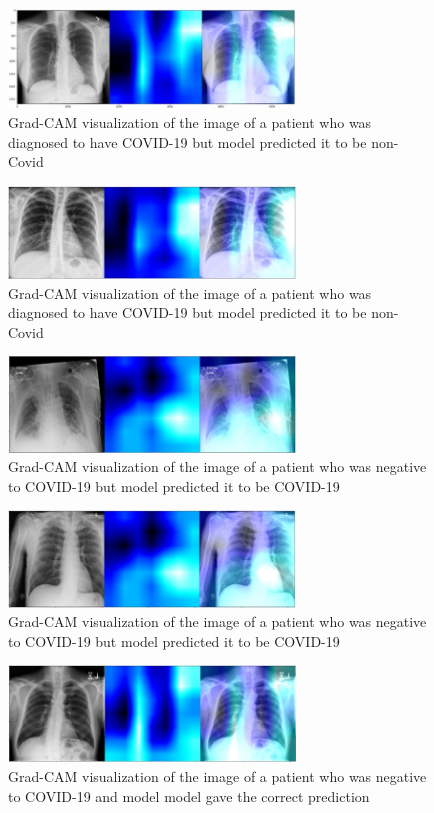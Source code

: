 \documentclass[10pt,journal,compsoc]{IEEEtran}
\begin{document}
\begin{figure}
\centering
\includegraphics[width=3.0in]{Picture4.jpg}
\caption{Grad-CAM visualization of the image of a patient who was diagnosed to have COVID-19 but model predicted it to be non-Covid}
\label{fig_6}
\end{figure}

\begin{figure}
\centering
\includegraphics[width=3.0in]{Picture5.jpg}
\caption{Grad-CAM visualization of the image of a patient who was diagnosed to have COVID-19 but model predicted it to be non-Covid}
\label{fig_7}
\end{figure}

\begin{figure}
\centering
\includegraphics[width=3.0in]{Picture6.jpg}
\caption{Grad-CAM visualization of the image of a patient who was negative to COVID-19 but model predicted it to be COVID-19}
\label{fig_8}
\end{figure}

\begin{figure}
\centering
\includegraphics[width=3.0in]{Picture7.jpg}
\caption{Grad-CAM visualization of the image of a patient who was negative to COVID-19 but model predicted it to be COVID-19}
\label{fig_9}
\end{figure}

\begin{figure}[!t]
\centering
\includegraphics[width=3.0in]{Picture8.jpg}
\caption{Grad-CAM visualization of the image of a patient who was negative to COVID-19 and model model gave the correct prediction}
\label{fig_10}
\end{figure}
\end{document}
